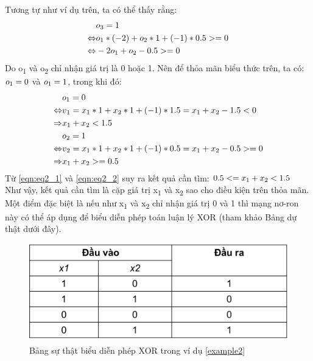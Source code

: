 \begin{answ}
Tương tự như ví dụ trên, ta có thể thấy rằng:
\begin{align}
  &o\textsubscript{3} = 1 \nonumber \\
  \Leftrightarrow  &o\textsubscript{1} * (-2) + o\textsubscript{2} * 1 + (-1)* 0.5 >= 0 \nonumber \\
  \Leftrightarrow  &-2o\textsubscript{1} + o\textsubscript{2} - 0.5 >= 0 \nonumber
\end{align}
Do o\textsubscript{1} và o\textsubscript{2} chỉ nhận giá trị là 0 hoặc 1. Nên để thỏa mãn biểu thức trên, ta có:
\(o\textsubscript{1} = 0\) và \(o\textsubscript{1} = 1\), trong khi đó:
\begin{align}
  &o\textsubscript{1} = 0 \nonumber\\
  \Leftrightarrow &v\textsubscript{1} = x\textsubscript{1} * 1 + x\textsubscript{2} * 1 + (-1) * 1.5 = x\textsubscript{1} + x\textsubscript{2} - 1.5 < 0 \nonumber\\
  \Rightarrow &x\textsubscript{1} + x\textsubscript{2} < 1.5 \label{eqn:eq2_1}\\
  &o\textsubscript{2} = 1 \nonumber\\
  \Leftrightarrow &v\textsubscript{2} = x\textsubscript{1} * 1 + x\textsubscript{2} * 1 + (-1) * 0.5 = x\textsubscript{1} + x\textsubscript{2} - 0.5 >= 0 \nonumber\\
  \Rightarrow &x\textsubscript{1} + x\textsubscript{2} >= 0.5 \label{eqn:eq2_2}
\end{align}
\noindent Từ \ref{eqn:eq2_1} và \ref{eqn:eq2_2} suy ra kết quả cần tìm: \( 0.5 <= x\textsubscript{1} + x\textsubscript{2} < 1.5\)\\

\noindent Như vậy, kết quả cần tìm là cặp giá trị x\textsubscript{1} và x\textsubscript{2} sao cho điều kiện trên thỏa mãn. Một điểm đặc biệt là nếu như x\textsubscript{1} và x\textsubscript{2} chỉ nhận giá trị 0 và 1 thì mạng nơ-ron này có thể áp dụng để biểu diễn phép toán luận lý XOR (tham khảo Bảng dự thật dưới đây).

\begin{figure}[h]
	\centering
		\includegraphics[width=0.6\columnwidth]{chapter01/figure/bang su that XOR.png}
		\centering
	\caption{Bảng sự thật biểu diễn phép XOR trong ví dụ \ref{example2}}
\end{figure}
\end{answ}

